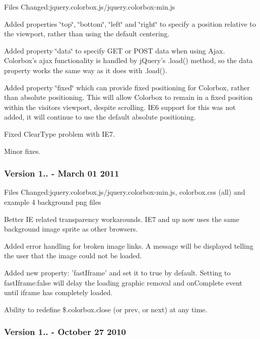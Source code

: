 Files Changed\-:jquery.\-colorbox.\-js/jquery.colorbox-\/min.\-js


\begin{DoxyItemize}
\item Added properties \char`\"{}top\char`\"{}, \char`\"{}bottom\char`\"{}, \char`\"{}left\char`\"{} and \char`\"{}right\char`\"{} to specify a position relative to the viewport, rather than using the default centering.
\item Added property \char`\"{}data\char`\"{} to specify G\-E\-T or P\-O\-S\-T data when using Ajax. Colorbox's ajax functionality is handled by j\-Query's .load() method, so the data property works the same way as it does with .load().
\item Added property \char`\"{}fixed\char`\"{} which can provide fixed positioning for Colorbox, rather than absolute positioning. This will allow Colorbox to remain in a fixed position within the visitors viewport, despite scrolling. I\-E6 support for this was not added, it will continue to use the default absolute positioning.
\item Fixed Clear\-Type problem with I\-E7.
\item Minor fixes.
\end{DoxyItemize}

\subsubsection*{Version 1.. -\/ March 01 2011}

Files Changed\-:jquery.\-colorbox.\-js/jquery.colorbox-\/min.\-js, colorbox.\-css (all) and example 4 background png files


\begin{DoxyItemize}
\item Better I\-E related transparency workarounds. I\-E7 and up now uses the same background image sprite as other browsers.
\item Added error handling for broken image links. A message will be displayed telling the user that the image could not be loaded.
\item Added new property\-: 'fast\-Iframe' and set it to true by default. Setting to fast\-Iframe\-:false will delay the loading graphic removal and on\-Complete event until iframe has completely loaded.
\item Ability to redefine \$.colorbox.\-close (or prev, or next) at any time.
\end{DoxyItemize}

\subsubsection*{Version 1.. -\/ October 27 2010}


